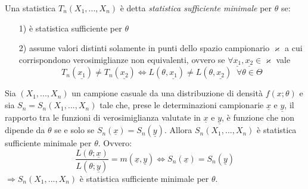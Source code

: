 \begin{definizione}
Una statistica $T_n(X_1,...,X_n)$ è detta \textit{statistica sufficiente minimale} per $\theta$ se:
\begin{enumerate}
\item [1)] è statistica sufficiente per $\theta$
\item [2)] assume valori distinti solamente in punti dello spazio campionario $\varkappa$ a cui corrispondono verosimiglianze non equivalenti, ovvero se $\forall \underline{x_1}, \underline{x_2} \in \varkappa$ vale 
$$T_n(\underline{x_1}) \neq T_n(\underline{x_2}) \Longleftrightarrow L(\theta, \underline{x_1}) \neq L(\theta, \underline{x_2}) \; \; \forall \theta \in \Theta$$
\end{enumerate}
\end{definizione}

\begin{teo}
Sia $(X_1,...,X_n)$ un campione casuale da una distribuzione di densità $f(x;\theta)$ e sia $S_n=S_n(X_1,...,X_n)$ tale che, prese le determinazioni campionarie $\underline{x}$ e $\underline{y}$, il rapporto tra le funzioni di verosimiglianza valutate in $\underline{x}$ e $\underline{y}$, è funzione che non dipende da $\theta$ se e solo se $S_n(\underline{x})=S_n(\underline{y})$. Allora $S_n(X_1,...,X_n)$ è statistica sufficiente minimale per $\theta$. Ovvero:
$$\frac{L(\theta;\underline{x})}{L(\theta;\underline{y})}=m(\underline{x},\underline{y}) \Longleftrightarrow S_n(\underline{x})=S_n(\underline{y})$$
$\Longrightarrow S_n(X_1,...,X_n)$ è statistica sufficiente minimale per $\theta$.
\end{teo}


